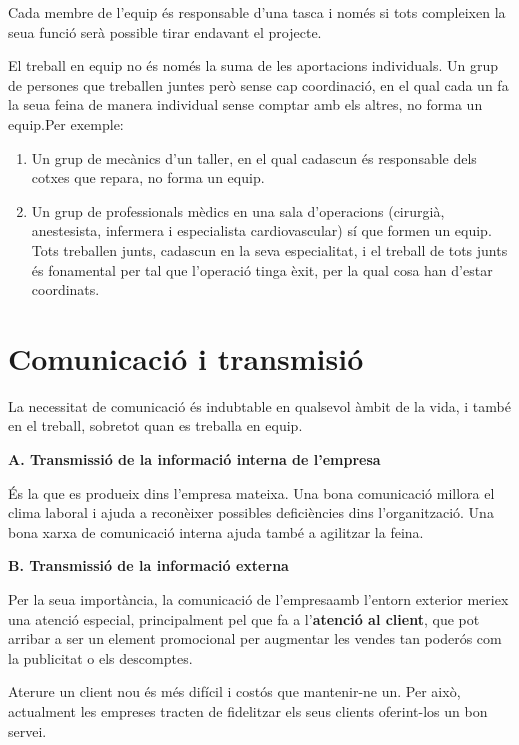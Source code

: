 \documentclass[
]{book}
\begin{document}
Cada membre de l'equip és responsable d'una tasca i només si tots compleixen la seua funció serà possible tirar endavant el projecte.

El treball en equip no és només la suma de les aportacions individuals. Un grup de persones que treballen juntes però sense cap coordinació, en el qual cada un fa la seua feina de manera individual sense comptar amb els altres, no forma un equip.Per exemple:

\begin{enumerate}
\def\labelenumi{\alph{enumi}.}
\item
  Un grup de mecànics d'un taller, en el qual cadascun és responsable dels cotxes que repara, no forma un equip.
\item
  Un grup de professionals mèdics en una sala d'operacions (cirurgià, anestesista, infermera i especialista cardiovascular) sí que formen un equip. Tots treballen junts, cadascun en la seva especialitat, i el treball de tots junts és fonamental per tal que l'operació tinga èxit, per la qual cosa han d'estar coordinats.
\end{enumerate}

\hypertarget{comunicaciuxf3-i-transmisiuxf3}{%
\chapter{Comunicació i transmisió}\label{comunicaciuxf3-i-transmisiuxf3}}

La necessitat de comunicació és indubtable en qualsevol àmbit de la vida, i també en el treball, sobretot quan es treballa en equip.

\textbf{A. Transmissió de la informació interna de l'empresa}

És la que es produeix dins l'empresa mateixa. Una bona comunicació millora el clima laboral i ajuda a reconèixer possibles deficiències dins l'organització. Una bona xarxa de comunicació interna ajuda també a agilitzar la feina.

\textbf{B. Transmissió de la informació externa}

Per la seua importància, la comunicació de l'empresaamb l'entorn exterior meriex una atenció especial, principalment pel que fa a l'\textbf{atenció al client}, que pot arribar a ser un element promocional per augmentar les vendes tan poderós com la publicitat o els descomptes.

Aterure un client nou és més difícil i costós que mantenir-ne un. Per això, actualment les empreses tracten de fidelitzar els seus clients oferint-los un bon servei.
\end{document}
